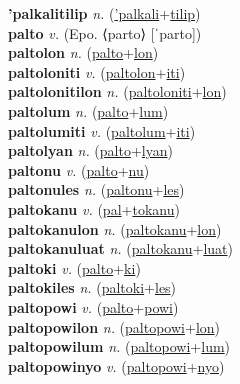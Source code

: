 \textbf{'palkalitilip} \textit{n.} (\hyperref['palkali]{'palkali}+\hyperref[tilip]{tilip})
 \label{'palkalitilip} \\
\textbf{palto} \textit{v.} (Epo. ⟨parto⟩ [ˈparto])
 \label{palto} \\
\textbf{paltolon} \textit{n.} (\hyperref[palto]{palto}+\hyperref[lon]{lon})
 \label{paltolon} \\
\textbf{paltoloniti} \textit{v.} (\hyperref[paltolon]{paltolon}+\hyperref[iti]{iti})
 \label{paltoloniti} \\
\textbf{paltolonitilon} \textit{n.} (\hyperref[paltoloniti]{paltoloniti}+\hyperref[lon]{lon})
 \label{paltolonitilon} \\
\textbf{paltolum} \textit{n.} (\hyperref[palto]{palto}+\hyperref[lum]{lum})
 \label{paltolum} \\
\textbf{paltolumiti} \textit{v.} (\hyperref[paltolum]{paltolum}+\hyperref[iti]{iti})
 \label{paltolumiti} \\
\textbf{paltolyan} \textit{n.} (\hyperref[palto]{palto}+\hyperref[lyan]{lyan})
 \label{paltolyan} \\
\textbf{paltonu} \textit{v.} (\hyperref[palto]{palto}+\hyperref[nu]{nu})
 \label{paltonu} \\
\textbf{paltonules} \textit{n.} (\hyperref[paltonu]{paltonu}+\hyperref[les]{les})
 \label{paltonules} \\
\textbf{paltokanu} \textit{v.} (\hyperref[pal]{pal}+\hyperref[tokanu]{tokanu})
 \label{paltokanu} \\
\textbf{paltokanulon} \textit{n.} (\hyperref[paltokanu]{paltokanu}+\hyperref[lon]{lon})
 \label{paltokanulon} \\
\textbf{paltokanuluat} \textit{n.} (\hyperref[paltokanu]{paltokanu}+\hyperref[luat]{luat})
 \label{paltokanuluat} \\
\textbf{paltoki} \textit{v.} (\hyperref[palto]{palto}+\hyperref[ki]{ki})
 \label{paltoki} \\
\textbf{paltokiles} \textit{n.} (\hyperref[paltoki]{paltoki}+\hyperref[les]{les})
 \label{paltokiles} \\
\textbf{paltopowi} \textit{v.} (\hyperref[palto]{palto}+\hyperref[powi]{powi})
 \label{paltopowi} \\
\textbf{paltopowilon} \textit{n.} (\hyperref[paltopowi]{paltopowi}+\hyperref[lon]{lon})
 \label{paltopowilon} \\
\textbf{paltopowilum} \textit{n.} (\hyperref[paltopowi]{paltopowi}+\hyperref[lum]{lum})
 \label{paltopowilum} \\
\textbf{paltopowinyo} \textit{v.} (\hyperref[paltopowi]{paltopowi}+\hyperref[nyo]{nyo})

